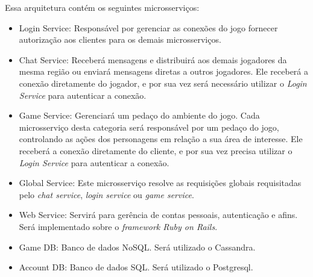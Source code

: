 Essa arquitetura contém os seguintes microsserviços:

\begin{itemize}
\item Login Service: Responsável por gerenciar as conexões do jogo fornecer autorização aos clientes para os demais microsserviços.
  \item Chat Service: Receberá mensagens e distribuirá aos demais jogadores da mesma região ou enviará mensagens diretas a outros jogadores. Ele receberá a conexão diretamente do jogador, e por sua vez será necessário utilizar o \textit{Login Service} para autenticar a conexão.
  \item Game Service: Gerenciará um pedaço do ambiente do jogo. Cada microsserviço desta categoria será responsável por um pedaço do jogo, controlando as ações dos personagens em relação a sua área de interesse. Ele receberá a conexão diretamente do cliente, e por sua vez precisa utilizar o \textit{Login Service} para autenticar a conexão.
  \item Global Service: Este microsserviço resolve as requisições globais requisitadas pelo \textit{chat service}, \textit{login service} ou \textit{game service}.
  \item Web Service: Servirá para gerência de contas pessoais, autenticação e afins. Será implementado sobre o \textit{framework Ruby on Rails}.
  \item Game DB: Banco de dados NoSQL. Será utilizado o Cassandra.
  \item Account DB: Banco de dados SQL. Será utilizado o Postgresql.
\end{itemize}
